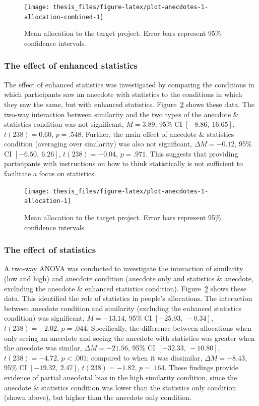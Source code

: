 \documentclass[a4paper, nobind, dvipsnames]{templates/ociamthesis}
\theoremstyle{definition}
\theoremstyle{definition}
\theoremstyle{definition}
\theoremstyle{definition}
\theoremstyle{remark}
\begin{document}
\begin{figure}
\texttt{[image: thesis\_files/figure-latex/plot-anecdotes-1-allocation-combined-1]} \caption{Mean allocation to the target project. Error bars represent 95\% confidence intervals.}\label{fig:plot-anecdotes-1-allocation-combined}
\end{figure}

\subsubsection{The effect of enhanced statistics}

The effect of enhanced statistics was investigated by comparing the conditions
in which participants saw an anecdote with statistics to the conditions in which
they saw the same, but with enhanced statistics.
Figure~\ref{fig:plot-anecdotes-1-allocation} shows these data. The two-way
interaction between similarity and the two types of the anecdote \& statistics
condition was not significant,
\(M = 3.89\), 95\% CI \([-8.86,~16.65]\), \(t(238) = 0.60\), \(p = .548\). Further, the main
effect of anecdote \& statistics condition (averaging over similarity) was also
not significant, \(\Delta M = -0.12\), 95\% CI \([-6.50,~6.26]\), \(t(238) = -0.04\), \(p = .971\). This
suggests that providing participants with instructions on how to think
statistically is not sufficient to facilitate a focus on statistics.



\begin{figure}
\texttt{[image: thesis\_files/figure-latex/plot-anecdotes-1-allocation-1]} \caption{Mean allocation to the target project. Error bars represent 95\% confidence intervals.}\label{fig:plot-anecdotes-1-allocation}
\end{figure}

\subsubsection{The effect of statistics}

A two-way ANOVA was conducted to investigate the interaction of similarity (low
and high) and anecdote condition (anecdote only and statistics \& anecdote,
excluding the anecdote \& enhanced statistics condition).
Figure~\ref{fig:plot-anecdotes-1-allocation} shows these data. This identified
the role of statistics in people's allocations. The interaction between anecdote
condition and similarity (excluding the enhanced statistics condition) was
significant, \(M = -13.14\), 95\% CI \([-25.93,~-0.34]\), \(t(238) = -2.02\), \(p = .044\).
Specifically, the difference between allocations when only seeing an anecdote
and seeing the anecdote with statistics was greater when the anecdote was
similar,
\(\Delta M = -21.56\), 95\% CI \([-32.33,~-10.80]\), \(t(238) = -4.72\), \(p < .001\); compared to when it
was dissimilar, \(\Delta M = -8.43\), 95\% CI \([-19.32,~2.47]\), \(t(238) = -1.82\), \(p = .164\). These
findings provide evidence of partial anecdotal bias in the high similarity
condition, since the anecdote \& statistics condition was lower than the
statistics only condition (shown above), but higher than the anecdote only
condition.
\end{document}
